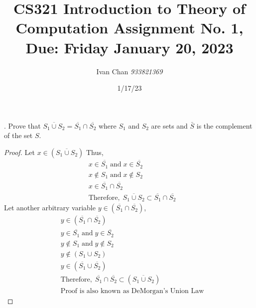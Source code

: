 \documentclass[12pt, letterpaper]{article}
\title{CS321 Introduction to Theory of Computation
Assignment No. 1, Due: Friday January 20, 2023}
\author{Ivan Chan \textit{933821369}}
\date{1/17/23}
\begin{document}
. Prove that $\overline{S_1 \cup S_2} = \overline{S_1} \cap \overline{S_2}$ where $S_1$ and $S_2$ are sets and $\bar{S}$ is the
    complement of the set $S$.
    \begin{proof}
        Let $x \in (\overline{S_1 \cup S_2})$ Thus,
        \begin{align*}
        & x \in \overline{S_1} \;\text{and}\; x \in \overline{S_2}\\
        & x \notin S_1 \;\mbox{and}\; x \notin S_2\\
        & x \in \overline{S_1} \cap \overline{S_2}\\
        & \mbox{Therefore},\; \overline{S_1 \cup S_2} \subset \overline{S_1} \cap \overline{S_2}
        \end{align*}
        Let another arbitrary variable $y \in (\overline{S_1} \cap \overline{S_2})$,
        \begin{align*}
        & y \in (\overline{S_1} \cap \overline{S_2})\\
        &    y \in \overline{S_1} \;\mbox{and}\; y \in \overline{S_2}\\
        &   y \notin S_1 \;\mbox{and}\; y \notin S_2\\
        &   y \notin (S_1 \cup S_2)\\
        &   y \in (\overline{S_1} \cup \overline{S_2})\\
        &   \mbox{Therefore}, \; \overline{S_1} \cap \overline{S_2} \subset (\overline{S_1 \cup S_2})\\
        &   \mbox{Proof is also known as DeMorgan's Union Law}
        \end{align*}
    \end{proof}
\end{document}
